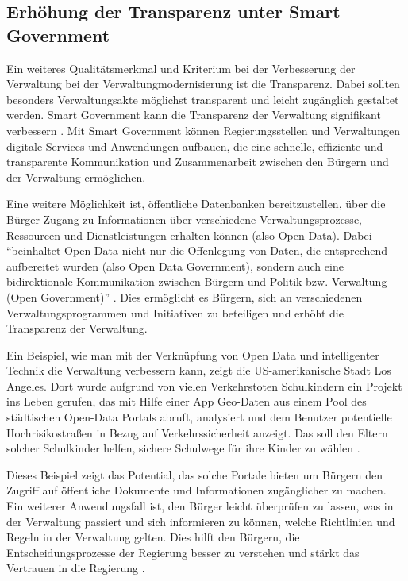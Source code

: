 \subsection{Erhöhung der Transparenz unter Smart Government}
Ein weiteres Qualitätsmerkmal und Kriterium bei der Verbesserung der Verwaltung bei der Verwaltungmodernisierung ist die Transparenz.
Dabei sollten besonders Verwaltungsakte möglichst transparent und leicht zugänglich gestaltet werden.
Smart Government kann die Transparenz der Verwaltung signifikant verbessern \citep[Vgl.][S.87]{Kersting2017}.
Mit Smart Government können Regierungsstellen und Verwaltungen digitale Services und Anwendungen aufbauen, die eine schnelle, effiziente und transparente Kommunikation und Zusammenarbeit zwischen den Bürgern und der Verwaltung ermöglichen. 
\par
Eine weitere Möglichkeit ist, öffentliche Datenbanken bereitzustellen, über die Bürger Zugang zu Informationen über verschiedene Verwaltungsprozesse, Ressourcen und Dienstleistungen erhalten können (also Open Data).
Dabei ``beinhaltet Open Data nicht nur die Offenlegung von Daten, die entsprechend aufbereitet wurden (also Open Data Government), sondern auch eine bidirektionale Kommunikation zwischen Bürgern und Politik bzw. Verwaltung (Open Government)'' \citep[Vgl.][S.94]{Kersting2017}.
Dies ermöglicht es Bürgern, sich an verschiedenen Verwaltungsprogrammen und Initiativen zu beteiligen und erhöht die Transparenz der Verwaltung.
\par
\label{LAVerkehr}
Ein Beispiel, wie man mit der Verknüpfung von Open Data und intelligenter Technik die Verwaltung verbessern kann, zeigt die US-amerikanische Stadt Los Angeles.
Dort wurde aufgrund von vielen Verkehrstoten Schulkindern ein Projekt ins Leben gerufen, das mit Hilfe einer App Geo-Daten aus einem Pool des städtischen Open-Data Portals abruft, analysiert und dem Benutzer potentielle Hochrisikostraßen in Bezug auf Verkehrssicherheit anzeigt.
Das soll den Eltern solcher Schulkinder helfen, sichere Schulwege für ihre Kinder zu wählen \citep[][]{LAVisionZero2023}.
\par
Dieses Beispiel zeigt das Potential, das solche Portale bieten um Bürgern den Zugriff auf öffentliche Dokumente und Informationen zugänglicher zu machen.
Ein weiterer Anwendungsfall ist, den Bürger leicht überprüfen zu lassen, was in der Verwaltung passiert und sich informieren zu können, welche Richtlinien und Regeln in der Verwaltung gelten. 
Dies hilft den Bürgern, die Entscheidungsprozesse der Regierung besser zu verstehen und stärkt das Vertrauen in die Regierung \citep[Vgl.][S.94]{Kersting2017}.

